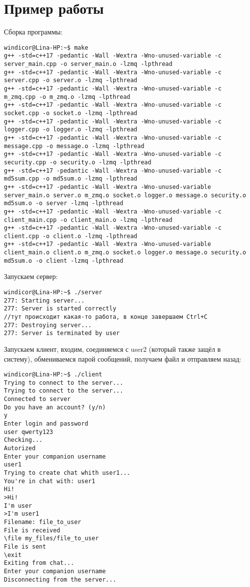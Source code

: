 \section{Пример работы}

Сборка программы:

\begin{verbatim}
windicor@Lina-HP:~$ make 
g++ -std=c++17 -pedantic -Wall -Wextra -Wno-unused-variable -c server_main.cpp -o server_main.o -lzmq -lpthread
g++ -std=c++17 -pedantic -Wall -Wextra -Wno-unused-variable -c server.cpp -o server.o -lzmq -lpthread
g++ -std=c++17 -pedantic -Wall -Wextra -Wno-unused-variable -c m_zmq.cpp -o m_zmq.o -lzmq -lpthread
g++ -std=c++17 -pedantic -Wall -Wextra -Wno-unused-variable -c socket.cpp -o socket.o -lzmq -lpthread
g++ -std=c++17 -pedantic -Wall -Wextra -Wno-unused-variable -c logger.cpp -o logger.o -lzmq -lpthread
g++ -std=c++17 -pedantic -Wall -Wextra -Wno-unused-variable -c message.cpp -o message.o -lzmq -lpthread
g++ -std=c++17 -pedantic -Wall -Wextra -Wno-unused-variable -c security.cpp -o security.o -lzmq -lpthread
g++ -std=c++17 -pedantic -Wall -Wextra -Wno-unused-variable -c md5sum.cpp -o md5sum.o -lzmq -lpthread
g++ -std=c++17 -pedantic -Wall -Wextra -Wno-unused-variable server_main.o server.o m_zmq.o socket.o logger.o message.o security.o md5sum.o -o server -lzmq -lpthread
g++ -std=c++17 -pedantic -Wall -Wextra -Wno-unused-variable -c client_main.cpp -o client_main.o -lzmq -lpthread       
g++ -std=c++17 -pedantic -Wall -Wextra -Wno-unused-variable -c client.cpp -o client.o -lzmq -lpthread
g++ -std=c++17 -pedantic -Wall -Wextra -Wno-unused-variable client_main.o client.o m_zmq.o socket.o logger.o message.o security.o md5sum.o -o client -lzmq -lpthread
\end{verbatim}

Запускаем сервер:

\begin{verbatim}
windicor@Lina-HP:~$ ./server
277: Starting server...
277: Server is started correctly
//тут происходит какая-то работа, в конце завершаем Ctrl+C
277: Destroying server...
277: Server is terminated by user
\end{verbatim}

Запускаем клиент, входим, соединяемся с user2 (который также защёл в систему), обмениваемся парой сообщений, получаем файл и отправляем назад:

\begin{verbatim}
windicor@Lina-HP:~$ ./client
Trying to connect to the server...
Trying to connect to the server...
Connected to server
Do you have an account? (y/n)
y
Enter login and password
user qwerty123
Checking...
Autorized
Enter your companion username
user1
Trying to create chat whith user1...
You're in chat with: user1
Hi!
>Hi!
I'm user
>I'm user1
Filename: file_to_user
File is received
\file my_files/file_to_user
File is sent
\exit
Exiting from chat...
Enter your companion username
Disconnecting from the server...
\end{verbatim}

\pagebreak


